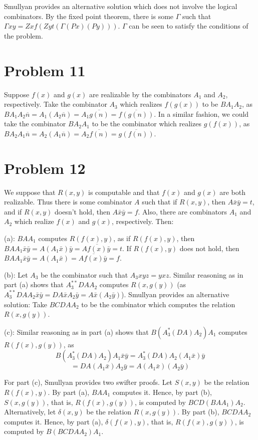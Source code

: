 \documentclass{article}
\theoremstyle{definition}
\begin{document}
Smullyan provides an alternative solution which does not involve the logical combinators. By the fixed point theorem, there is some $\Gamma$ such that 
$\Gamma xy=Zxf(Zyt(\Gamma(Px)(Py)))$. $\Gamma$ can be seen to satisfy the conditions of the problem.

\section*{Problem 11}
Suppose $f(x)$ and $g(x)$ are realizable by the combinators $A_1$ and $A_2$, respectively. Take the combinator $A_3$ which realizes $f(g(x))$ to be 
$BA_1A_2$, as $BA_1A_2\overline{n}=A_1(A_2\overline{n})=A_1\overline{g(n)}=\overline{f(g(n))}$. In a similar fashion, we could take the combinator $BA_2A_1$ to be the combinator which realizes 
$g(f(x))$, as $BA_2A_1\overline{n}=A_2(A_1\overline{n})=A_2\overline{f(n)}=\overline{g(f(n))}$.

\section*{Problem 12}
We suppose that $R(x,y)$ is computable and that $f(x)$ and $g(x)$ are both realizable. Thus there is some combinator $A$ such that if $R(x,y)$, then 
$A\bar{x}\bar{y}=t$, and if $R(x,y)$ doesn't hold, then $A\bar{x}\bar{y}=f$. Also, there are combinators $A_1$ and $A_2$ which realize $f(x)$ and $g(x)$, 
respectively. Then:


(a): $BAA_1$ computes $R(f(x),y)$, as if $R(f(x),y)$, then $BAA_1\bar{x}\bar{y}=A(A_1\bar{x})\bar{y}=A\overline{f(x)}\bar{y}=t$. If $R(f(x),y)$ does not hold, then 
$BAA_1\bar{x}\bar{y}=A(A_1\bar{x})=A\overline{f(x)}\bar{y}=f$. 


(b): Let $A_3$ be the combinator such that $A_3xyz=yxz$. Similar reasoning as in part (a) shows that $A_3^{**}DAA_2$ computes $R(x,g(y))$ 
(as $A_3^{**}DAA_2\bar{x}\bar{y}=DA\bar{x}A_2\bar{y}=A\bar{x}(A_2\bar{y})$). Smullyan provides an alternative solution: Take $BCDAA_2$ to be the combinator which computes the 
relation $R(x,g(y))$.


(c): Similar reasoning as in part (a) shows that $B(A_3^*(DA)A_2)A_1$ computes $R(f(x),g(y))$, as
\[ B(A_3^*(DA)A_2)A_1\bar{x}\bar{y}=A_3^*(DA)A_2(A_1\bar{x})\bar{y} \]
\[ =DA(A_1\bar{x})A_2\bar{y}=A(A_1\bar{x})(A_2\bar{y}) \]


For part (c), Smullyan provides two swifter proofs. Let $S(x,y)$ be the relation $R(f(x),y)$. By part (a), $BAA_1$ computes it. Hence, by part (b), 
$S(x,g(y))$, that is, $R(f(x),g(y))$, is computed by $BCD(BAA_1)A_2$. Alternatively, let $\delta(x,y)$ be the relation $R(x,g(y))$. By part (b), $BCDAA_2$ computes it.
Hence, by part (a), $\delta(f(x),y)$, that is, $R(f(x),g(y))$, is computed by $B(BCDAA_2)A_1$.
\end{document}
